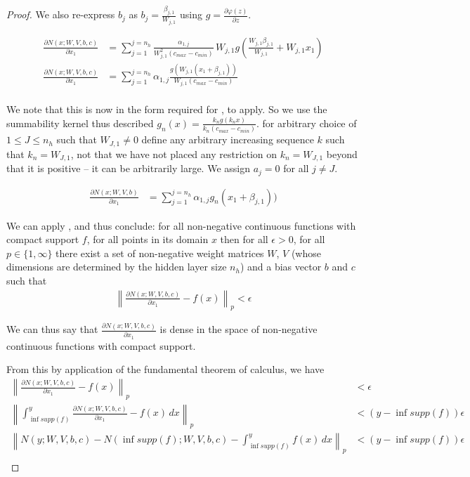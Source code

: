 \documentclass{article} %
\begin{document}
\begin{proof}
We also re-express $b_j$ as $b_j=\frac{\beta_{j,1}}{W_{j,1}}$  using $g = \frac{\partial\varphi(z)}{\partial z}$.


\begin{align}
\frac{\partial N(x;W,V,b,c)}{\partial x_1} 
&= \sum_{j=1}^{j=n_h} \frac{\alpha_{1,j}}{W_{j,1}^2(c_{max}-c_{min})} \, W_{j,1} g(\frac{W_{j,1}\beta_{j,1}}{W_{j,1}} + W_{j,1}x_1)\\
\frac{\partial N(x;W,V,b,c)}{\partial x_1} 
&= \sum_{j=1}^{j=n_h} \alpha_{1,j} \frac{ g(W_{j,1}\left( x_1 + \beta_{j,1} \right))}{W_{j,1}(c_{max}-c_{min})} \\
\end{align}

We note that this is now in the form required for ,
to apply.
So we use the summability kernel thus described $g_n(x) = \frac{k_n g(k_n x)}{k_n(c_{max}-c_{min})}$.
for arbitrary choice of $1 \le J \le n_h$ such that $W_{J,1} \ne 0$
define any arbitrary increasing sequence $k$ such that $k_n=W_{J,1}$,
not that we have not placed any restriction on $k_n=W_{J,1}$ beyond that it is positive -- it can be arbitrarily large.
We assign  $a_j=0$ for all $j \ne J$.


\begin{align}
\frac{\partial N(x;W,V,b)}{\partial x_1} 
&= \sum_{j=1}^{j=n_h} \alpha_{1,j} g_n\left( x_1 + \beta_{j,1} \right))
\end{align}

We can apply , and thus conclude:
for all non-negative continuous functions with compact support $f$,
for all points in its domain $x$
then for all $\epsilon > 0$, for all $p\in \lbrace 1, \infty \rbrace$
there exist a set of non-negative weight matrices $W$, $V$ (whose dimensions are determined by the hidden layer size $n_h$) and a bias vector $b$ and $c$
such that 
\begin{align}
\left\|\frac{\partial N(x;W,V,b, c)}{\partial x_1} - f(x) \right\|_p < \epsilon
\end{align}

We can thus say that $\frac{\partial N(x;W,V,b,c)}{\partial x_1}$ is dense in the space of non-negative continuous functions with compact support.

From this by application of the fundamental theorem of calculus,
we have
\begin{align}
\left\| \frac{\partial N(x;W,V,b, c)}{\partial x_1} - f(x) \right\|_p &< \epsilon \\
\left\| \int_{\inf supp(f)}^y \frac{\partial N(x;W,V,b, c)}{\partial x_1} - f(x) \, dx \right\|_p &< \left( y-\inf supp(f) \right)  \epsilon \\
\left\| N(y;W,V,b, c) - N(\inf supp(f);W,V,b, c) - \int_{\inf supp(f)}^y f(x) \, dx \right\|_p &< \left( y-\inf supp(f) \right)  \epsilon\\
\end{align}


\end{proof}
\end{document}

